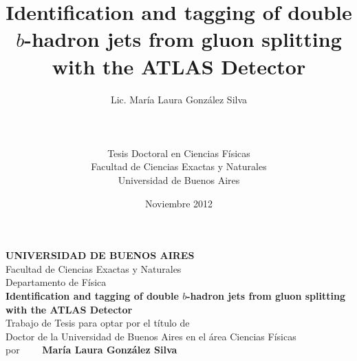 \documentclass[11pt,a4paper,12pt]{report}
\title{Identification and tagging of double $b$-hadron jets from gluon splitting with the ATLAS Detector}
\author{Lic. Mar\'ia Laura Gonz\'alez Silva \\ \\ \\ \\Tesis Doctoral en Ciencias F\'isicas\\Facultad de Ciencias Exactas y Naturales\\Universidad de Buenos Aires}
\date{Noviembre 2012}
\begin{document}
\maketitle


\newpage

\thispagestyle{empty}
\begin{figure}[h]
  \begin{center}
  \end{center}
\end{figure}

\begin{center}
  {\bfseries UNIVERSIDAD DE BUENOS AIRES}\\
  \vspace{0.5cm}
  Facultad de Ciencias Exactas y Naturales\\
  \vspace{0.5cm}
  Departamento de F\'isica\\
  \vspace{1.5cm}
         {\large {\bfseries Identification and tagging of double $b$-hadron jets from gluon splitting with the ATLAS Detector}}\\
         \vspace{1.5cm}
         Trabajo de Tesis para optar por el t\'itulo de \\
         Doctor de la Universidad de Buenos Aires en el \'area Ciencias F\'isicas\\
         \vspace{1.5cm}
         por $\qquad ${\bfseries Mar\'ia Laura Gonz\'alez Silva}\\
         \vspace{1.5cm}
\end{center}
\end{document}
